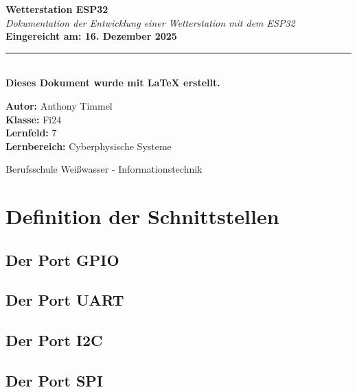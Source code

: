 \documentclass[18pt]{article}
\begin{document}
\begin{titlepage}
	\centering
	\vspace{2cm}
	{\Huge \bfseries Wetterstation ESP32\\}
	\vspace{1cm}
	{\Large \itshape Dokumentation der Entwicklung einer Wetterstation mit dem ESP32\\}
	\vspace{3cm}
	{\bfseries Eingereicht am: 16. Dezember 2025\\}
	\vspace{0.5cm}
	\rule{10cm}{1pt}\\
	\vspace{0.5cm}
	{\bfseries Dieses Dokument wurde mit \LaTeX{} erstellt.\\}
	
	\vfill
	
	\begin{flushleft}
		\large
		\textbf{Autor:} Anthony Timmel\\
		\textbf{Klasse:} Fi24\\
		\textbf{Lernfeld:} 7\\
		\textbf{Lernbereich:} Cyberphysische Systeme\\
	\end{flushleft}
	\vspace{3cm}
	{\large Berufsschule Weißwasser - Informationstechnik}
	
\end{titlepage}
\newpage
\tableofcontents
\newpage

\section{Definition der Schnittstellen}
\subsection[GPIO]{Der Port GPIO}
\subsection[UART]{Der Port UART}
\subsection[I2C]{Der Port I2C}
\subsection[SPI]{Der Port SPI}
\end{document}
